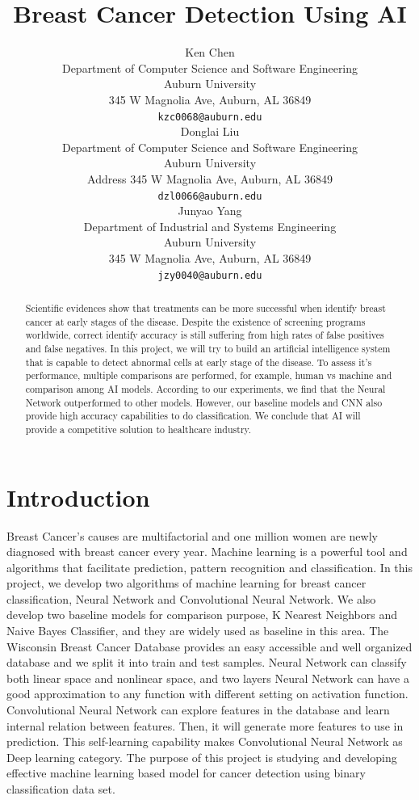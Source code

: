 \documentclass{article} %
\title{Breast Cancer Detection Using AI}
\author{
Ken Chen \\
Department of Computer Science and Software Engineering\\
Auburn University\\
345 W Magnolia Ave, Auburn, AL 36849 \\
\texttt{kzc0068@auburn.edu} \\
\And
Donglai Liu \\
Department of Computer Science and Software Engineering \\
Auburn University\\
Address 345 W Magnolia Ave, Auburn, AL 36849\\
\texttt{dzl0066@auburn.edu} \\
\AND
Junyao Yang \\
Department of Industrial and Systems Engineering \\
Auburn University\\
345 W Magnolia Ave, Auburn, AL 36849 \\
\texttt{jzy0040@auburn.edu} \\
}
\begin{document}
\maketitle

\begin{abstract}
Scientific evidences show that treatments can be more successful when identify breast cancer at early stages of the disease. Despite the existence of screening programs worldwide, correct identify accuracy is still suffering from high rates of false positives and false negatives. In this project, we will try to build an artificial intelligence system that is capable to detect abnormal cells at early stage of the disease. To assess it's performance, multiple comparisons are performed, for example, human vs machine and comparison among AI models. According to our experiments, we find that the Neural Network outperformed to other models. However, our baseline models and CNN also provide high accuracy capabilities to do classification. We conclude that AI will provide a competitive solution to healthcare industry. 
\end{abstract}

\section{Introduction}
Breast Cancer's causes are multifactorial and one million women are newly diagnosed with breast cancer every year. Machine learning is a powerful tool and algorithms that facilitate prediction, pattern recognition and classification. In this project, we develop two algorithms of machine learning for breast cancer classification, Neural Network and Convolutional Neural Network. We also develop two baseline models for comparison purpose, K Nearest Neighbors and Naive Bayes Classifier, and they are widely used  as baseline in this area. The Wisconsin Breast Cancer Database provides an easy accessible and well organized database and we split it into train and test samples. Neural Network can classify both linear space and nonlinear space, and two layers Neural Network can have a good approximation to any function with different setting on activation function. Convolutional Neural Network can explore features in the database and learn internal relation between features. Then, it will generate more features to use in prediction. This self-learning capability makes Convolutional Neural Network as Deep learning category. The purpose of this project is studying and developing effective machine learning based model for cancer detection using binary classification data set. 
\end{document}
